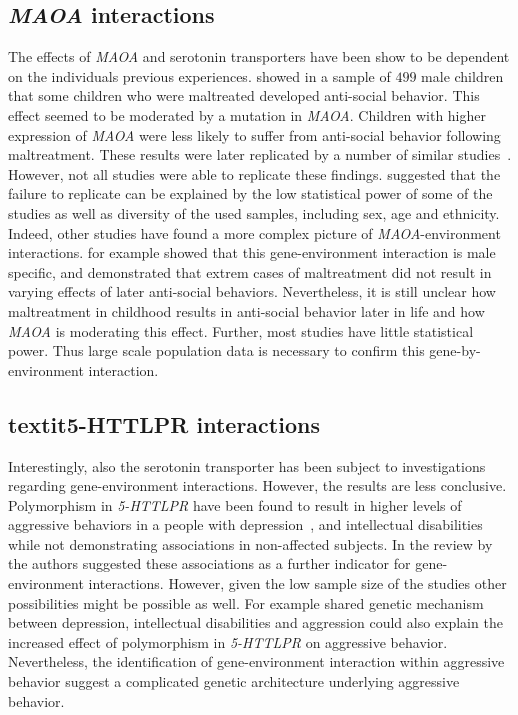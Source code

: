 \documentclass[../header.tex]{subfiles}
\begin{document}
\subsection{\textit{MAOA} interactions}
\label{sub:maoa_interactions}

The effects of \textit{MAOA} and serotonin transporters have been show to be dependent on the individuals previous experiences.
\citet{Caspi2002} showed in a sample of $499$ male children that some children who were maltreated developed anti-social behavior.
This effect seemed to be moderated by a mutation in \textit{MAOA}.
Children with higher expression of \textit{MAOA} were less likely to suffer from anti-social behavior following maltreatment.
These results were later replicated by a number of similar studies~\cite{KimCohen2006}.
However, not all studies were able to replicate these findings.
\citet{Anholt2012} suggested that the failure to replicate can be explained by the low statistical power of some of the studies as well as diversity of the used samples, including sex, age and ethnicity.
Indeed, other studies have found a more complex picture of \textit{MAOA}-environment interactions.
\citet{Huang2004} for example showed that this gene-environment interaction is male specific, and \citet{Weder2009} demonstrated that extrem cases of maltreatment did not result in varying effects of later anti-social behaviors.
Nevertheless, it is still unclear how maltreatment in childhood results in anti-social behavior later in life and how \textit{MAOA} is moderating this effect.
Further, most studies have little statistical power.
Thus large scale population data is necessary to confirm this gene-by-environment interaction.

\subsection{textit{5-HTTLPR} interactions}
\label{sub:httlpr_interactions}
Interestingly, also the serotonin transporter has been subject to investigations regarding gene-environment interactions.
However, the results are less conclusive.
Polymorphism in \textit{5-HTTLPR} have been found to result in higher levels of aggressive behaviors in a people with depression~\cite{Gonda2011}, and intellectual disabilities~\cite{May2010} while not demonstrating associations in non-affected subjects.
In the review by~\citet{Anholt2012} the authors suggested these associations as a further indicator for gene-environment interactions.
However, given the low sample size of the studies other possibilities might be possible as well.
For example shared genetic mechanism between depression, intellectual disabilities and aggression could also explain the increased effect of polymorphism in \textit{5-HTTLPR} on aggressive behavior. 
Nevertheless, the identification of gene-environment interaction within aggressive behavior suggest a complicated genetic architecture underlying aggressive behavior.
\bigskip
\end{document}
